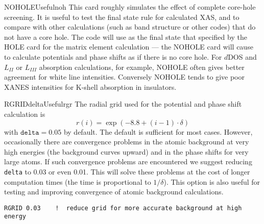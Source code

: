 \documentclass[11pt,oneside]{report} %
\begin{document}
\begin{Card}{NOHOLE}{}{Useful}{noh}
  This card roughly simulates the effect of complete core-hole
  screening.  It is useful to test the final state rule for
  calculated XAS, and to compare with other calculations (such as band
  structure or other codes) that do not have a core hole.
   The code will use as the final state that specified by the HOLE card
   for the matrix element calculation --- the NOHOLE card will cause
  {\feff} to calculate potentials and phase shifts as if
  there is no core hole.  For $d$DOS and $L_{II}$ or $L_{III}$
  absorption calculations, for example,  NOHOLE often gives better
  agreement for white line intensities. Conversely NOHOLE tends to give
  poor XANES intensities for K-shell absorption in insulators.
\end{Card}


\begin{Card}{RGRID}{delta}{Useful}{rgr}
  The radial grid used for the potential and phase shift calculation
  is $$r(i) = \exp(-8.8 + (i-1)\cdot\delta)$$ with $\mathtt{delta} =
  0.05$ by default.  The default is sufficient for most cases.  However,
  occasionally there are
  convergence problems in the atomic background at very high
  energies (the background curves upward) and in the phase
  shifts for very large atoms.  If such convergence problems are encountered
  we suggest reducing \texttt{delta} to 0.03 or even 0.01. This will solve
  these problems at the cost of longer computation times (the time is
  proportional to $1/\delta $).  This option is also useful for testing
  and improving convergence of atomic background calculations.
\end{Card}
\begin{verbatim}
RGRID 0.03    !  reduce grid for more accurate background at high energy
\end{verbatim}
\end{document}
